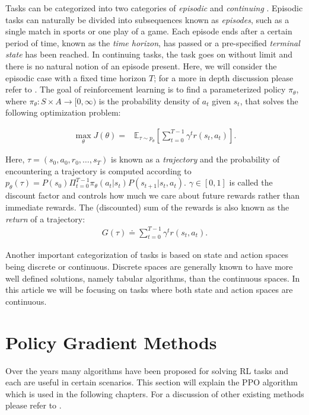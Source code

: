 Tasks can be categorized into two categories of \textit{episodic} and \textit{continuing} \cite{rlbook}. Episodic tasks can naturally be divided into subsequences known as \textit{episodes}, such as a single match in sports or one play of a game. Each episode ends after a certain period of time, known as the \textit{time horizon}, has passed or a pre-specified \textit{terminal state} has been reached. In continuing tasks, the task goes on without limit and there is no natural notion of an episode present. Here, we will consider the episodic case with a fixed time horizon $T$; for a more in depth discussion please refer to \cite{rlbook}. The goal of reinforcement learning is to find a parameterized policy $\pi_\theta$, where $\pi_\theta: S \times A \to [0, \infty)$ is the probability density of $a_t$ given $s_t$, that solves the following optimization problem:

\begin{align}
\label{eq:return}
\mathop{\mathrm{max}}_\theta J(\theta) = &\mathbb{E}_{\tau\sim p_\theta}\left[\sum_{t=0}^{T-1}\gamma^t{r({s}_t, {a}_t)} \right].
\end{align}

Here, $\tau = (s_0, a_0, r_0, \dots, s_T)$ is known as a \textit{trajectory} and the probability of encountering a trajectory is computed according to $p_\theta(\tau) = P(s_0) \Pi_{t=0}^{T-1} \pi_\theta(a_t|s_t) P(s_{t+1}|s_t,a_t)$. $\gamma \in [0,1]$ is called the discount factor and controls how much we care about future rewards rather than immediate rewards. The (discounted) sum of the rewards is also known as the \textit{return} of a trajectory:
\begin{align*}
    G(\tau) \doteq \sum_{t=0}^{T-1}\gamma^t{r({s}_t, {a}_t)}.
\end{align*}

Another important categorization of tasks is based on state and action spaces being discrete or continuous. Discrete spaces are generally known to have more well defined solutions, namely tabular algorithms, than the continuous spaces. In this article we will be focusing on tasks where both state and action spaces are continuous.

\section{Policy Gradient Methods}
\label{sec:background_pg}

Over the years many algorithms have been proposed for solving \ac{RL} tasks and each are useful in certain scenarios. This section will explain the \ac{PPO} algorithm which is used in the following chapters. For a discussion of other existing methods please refer to \cite{rl_survey}.

